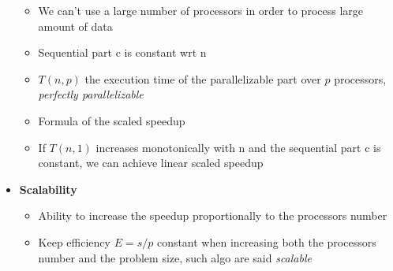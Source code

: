 \documentclass[12pt,oneside]{report}
\begin{document}
\begin{itemize}
    \begin{itemize}
        \item We can't use a large number of processors in order to process large amount of data
        \item Sequential part c is constant wrt n
        \item \(T(n,p)\) the execution time of the parallelizable part over \(p\) processors, \textit{perfectly parallelizable}
        \item Formula of the scaled speedup
        \item If \(T(n,1)\) increases monotonically with n and the sequential part c is constant, we can achieve linear scaled speedup 
    \end{itemize}
    \item \textbf{Scalability}
    \begin{itemize}
        \item Ability to increase the speedup proportionally to the processors number
        \item Keep efficiency \(E=s/p\) constant when increasing both the processors number and the problem size, such algo are said \textit{scalable}
    \end{itemize}
\end{itemize}
\end{document}
